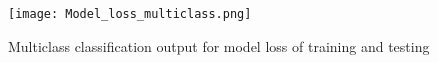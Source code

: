 \begin{figure}[H]
    \centering
    \texttt{[image: Model\_loss\_multiclass.png]}
    \caption{Multiclass classification output for model loss of training and testing}
    \label{fig:my_label-098365}
\end{figure}




    




